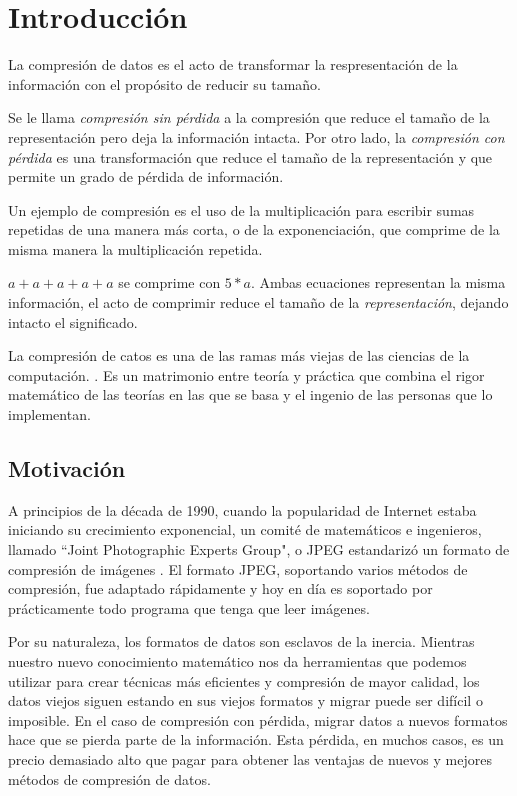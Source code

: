 \chapter{Introducción}\label{ch:introduction}

La \gls{compresión de datos} es el acto de transformar la respresentación de la
información con el propósito de reducir su tamaño.

Se le llama \emph{\gls{compresión sin pérdida}} a la compresión que reduce el tamaño
de la representación pero deja la información intacta. Por otro lado, la
\emph{\gls{compresión con pérdida}} es una transformación que reduce el tamaño de la
representación y que permite un grado de pérdida de información.

Un ejemplo de compresión es el uso de la multiplicación para escribir sumas
repetidas de una manera más corta, o de la exponenciación, que comprime de la
misma manera la multiplicación repetida.

$ a + a + a + a + a $ se comprime con $ 5 * a $. Ambas ecuaciones representan la
misma información, el acto de comprimir reduce el tamaño de la
\emph{representación}, dejando intacto el significado.

La compresión de catos es una de las ramas más viejas de las ciencias de la
computación. \cite{cs_the_discipline}. Es un matrimonio entre teoría y práctica
que combina el rigor matemático de las teorías en las que se basa y el ingenio
de las personas que lo implementan.

\section{Motivación}

A principios de la década de 1990, cuando la popularidad de Internet estaba
iniciando su crecimiento exponencial, un comité de matemáticos e ingenieros,
llamado ``Joint Photographic Experts Group", o \gls{JPEG} estandarizó un formato de
compresión de imágenes \cite{jpeg-spec}. El formato JPEG, soportando varios
métodos de compresión, fue adaptado rápidamente y hoy en día es soportado por
prácticamente todo programa que tenga que leer imágenes.

Por su naturaleza, los formatos de datos son esclavos de la inercia. Mientras
nuestro nuevo conocimiento matemático nos da herramientas que podemos utilizar
para crear técnicas más eficientes y compresión de mayor calidad, los datos
viejos siguen estando en sus viejos formatos y migrar puede ser difícil o
imposible. En el caso de \gls{compresión con pérdida}, migrar datos a nuevos formatos
hace que se pierda parte de la información. Esta pérdida, en muchos casos, es
un precio demasiado alto que pagar para obtener las ventajas de nuevos y
mejores métodos de compresión de datos.


